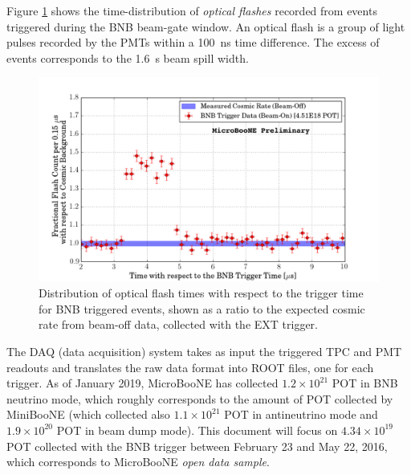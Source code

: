 Figure \ref{fig:trigger} shows the time-distribution of \emph{optical flashes} recorded from events triggered during the BNB beam-gate window. An optical flash is a group of light pulses recorded by the PMTs within a 100~ns time difference. The excess of events corresponds to the 1.6~\si{\micro}s beam spill width. 

\begin{figure}[htbp]
    \centering
    \includegraphics[width=0.85\linewidth]{figures/trigger.pdf}
    \caption{Distribution of optical flash times with respect to the trigger time for BNB triggered events, shown as a ratio to the expected cosmic rate from beam-off data, collected with the EXT trigger.}
    \label{fig:trigger}
\end{figure}

The DAQ (data acquisition) system takes as input the triggered TPC and PMT readouts and translates the raw data format into ROOT files, one for each trigger. As of January 2019, MicroBooNE has collected $1.2\times10^{21}$ POT in BNB neutrino mode, which roughly corresponds to the amount of POT collected by MiniBooNE (which collected also $1.1\times10^{21}$ POT in antineutrino mode and $1.9\times10^{20}$ POT in beam dump mode).
This document will focus on $4.34\times10^{19}$ POT collected with the BNB trigger between February 23 and May 22, 2016, which corresponds to MicroBooNE \emph{open data sample}. 